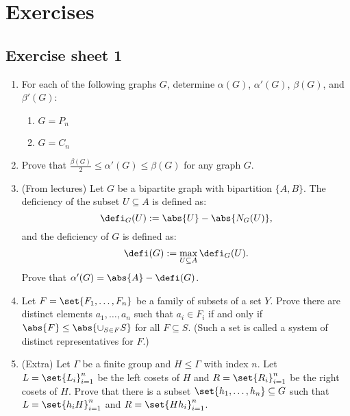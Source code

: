 \section{Exercises}
\subsection*{Exercise sheet 1}
\begin{enumerate}
    \item For each of the following graphs $G$, determine $\alpha(G)$, $\alpha'(G)$, $\beta(G)$, 
    and $\beta'(G)$:
    \begin{enumerate}
        \item $G = P_n$
        \item $G = C_n$
    \end{enumerate}
    
    \item Prove that $\frac{\beta(G)}{2} \leq \alpha'(G) \leq \beta(G)$ for any graph $G$.
    
    \item (From lectures) Let $G$ be a bipartite graph with bipartition $\{A, B\}$. The deficiency 
    of the subset $U \subseteq A$ is defined as:
    \[
    \defi_G(U) := \abs{U} - \abs{N_G(U)},
    \]
    and the deficiency of $G$ is defined as:
    \[
    \defi(G) := \max_{U \subseteq A} \defi_G(U).
    \]
    Prove that $\alpha'(G) = \abs{A} - \defi(G)$.
    
    \item Let $F = \set{F_1, \dots, F_n}$ be a family of subsets of a set $Y$. 
    Prove there are distinct elements $a_1, \dots, a_n$ such that $a_i \in F_i$ if and only if 
    $\abs{F} \leq \abs{\cup_{S \in F} S}$ for all $F \subseteq S$. 
    (Such a set is called a system of distinct representatives for $F$.)
    
    \item (Extra) Let $\Gamma$ be a finite group and $H \leq \Gamma$ with index $n$. 
    Let $L = \set{L_i}_{i=1}^n$ be the left cosets of $H$ and $R = \set{R_i}_{i=1}^n$ be the right cosets of $H$. 
    Prove that there is a subset $\set{h_1, \dots, h_n} \subseteq G$ such that $L = \set{h_i H}_{i=1}^n$ and 
    $R = \set{H h_i}_{i=1}^n$.
\end{enumerate}

\newpage
